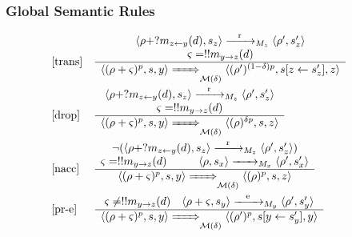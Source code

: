 \documentclass{sig-alternate}
\renewcommand{\d}{\delta}
\begin{document}
\subsubsection{Global Semantic Rules}

\begin{table}[bt!]
\centering
\begin{equation*}
\hspace{-0.5cm}\begin{array}{ll}


\text{[trans]} &
\frac{
\begin{array}{c}
\langle \rho + ?m_{z \leftarrow y}(d), s_z \rangle \smallstep{\mathrm{r}}{z} \langle \rho', s_z' \rangle \\ \varsigma = !!m_{y \rightarrow z}(d)
\end{array}}{
\begin{array}{c}
\langle (\rho + \varsigma)^p, s, y \rangle \bigstep{} \langle (\rho')^{(1-\d)p}, s[z \leftarrow s_z'], z \rangle
\end{array}} \\[\lsp]

\text{[drop]} &
\frac{
\begin{array}{c}
\langle \rho + ?m_{z \leftarrow y}(d), s_z\rangle \smallstep{\mathrm{r}}{z} \langle \rho', s_z' \rangle \\ \varsigma = !!m_{y \rightarrow z}(d)
\end{array}}{
\begin{array}{c}
\langle(\rho + \varsigma)^p, s, y \rangle \bigstep{} \langle (\rho)^{\d p}, s, z \rangle
\end{array}} \\[\lsp]

\text{[nacc]} &
\frac{
\begin{array}{c}
\neg(\langle \rho + ?m_{z \leftarrow y}(d), s_z \rangle \smallstep{\mathrm{r}}{z} \langle \rho', s_z' \rangle) \\ \varsigma = !!m_{y \rightarrow z}(d) \hspace{1cm} \langle \rho, s_x \rangle \smallstep{}{x} \langle \rho', s_x' \rangle
\end{array}}{
\begin{array}{c}
\langle (\rho + \varsigma)^p, s, y \rangle \bigstep{} \langle (\rho)^p, s, z \rangle
\end{array}} \\[\lsp]

\text{[pr-e]} &
\frac{
\begin{array}{ccc}
\varsigma \neq !!m_{y \rightarrow z}(d) & \langle \rho + \varsigma, s_y \rangle \smallstep{\mathrm{e}}{y} \langle \rho', s_y' \rangle
\end{array}}{
\begin{array}{c}
\langle (\rho + \varsigma)^p, s, y \rangle \bigstep{} \langle (\rho')^p, s[y \leftarrow s_y'], y \rangle
\end{array}} \\[\lsp]


\end{array}
\end{equation*}
\end{table}
\end{document}
